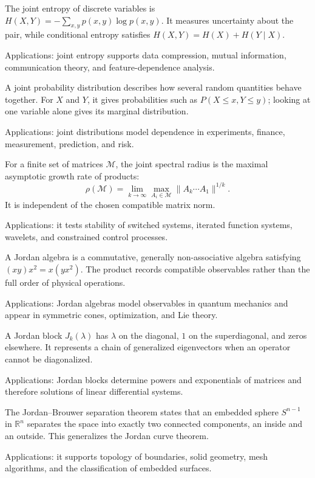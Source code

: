 The joint entropy of discrete variables is $H(X,Y)=-\sum_{x,y}p(x,y)\log p(x,y)$. It measures uncertainty about the pair, while conditional entropy satisfies $H(X,Y)=H(X)+H(Y\mid X)$. \par\noindent Applications: joint entropy supports data compression, mutual information, communication theory, and feature-dependence analysis.

A joint probability distribution describes how several random quantities behave together. For $X$ and $Y$, it gives probabilities such as $P(X\le x,Y\le y)$; looking at one variable alone gives its marginal distribution. \par\noindent Applications: joint distributions model dependence in experiments, finance, measurement, prediction, and risk.

For a finite set of matrices $\mathcal M$, the joint spectral radius is the maximal asymptotic growth rate of products:
\[
\rho(\mathcal M)=\lim_{k\to\infty}\max_{A_i\in\mathcal M}\|A_k\cdots A_1\|^{1/k}.
\]
It is independent of the chosen compatible matrix norm. \par\noindent Applications: it tests stability of switched systems, iterated function systems, wavelets, and constrained control processes.

A Jordan algebra is a commutative, generally non-associative algebra satisfying $(xy)x^2=x(yx^2)$. The product records compatible observables rather than the full order of physical operations. \par\noindent Applications: Jordan algebras model observables in quantum mechanics and appear in symmetric cones, optimization, and Lie theory.

A Jordan block $J_k(\lambda)$ has $\lambda$ on the diagonal, $1$ on the superdiagonal, and zeros elsewhere. It represents a chain of generalized eigenvectors when an operator cannot be diagonalized. \par\noindent Applications: Jordan blocks determine powers and exponentials of matrices and therefore solutions of linear differential systems.

The Jordan--Brouwer separation theorem states that an embedded sphere $S^{n-1}$ in $\mathbb R^n$ separates the space into exactly two connected components, an inside and an outside. This generalizes the Jordan curve theorem. \par\noindent Applications: it supports topology of boundaries, solid geometry, mesh algorithms, and the classification of embedded surfaces.

